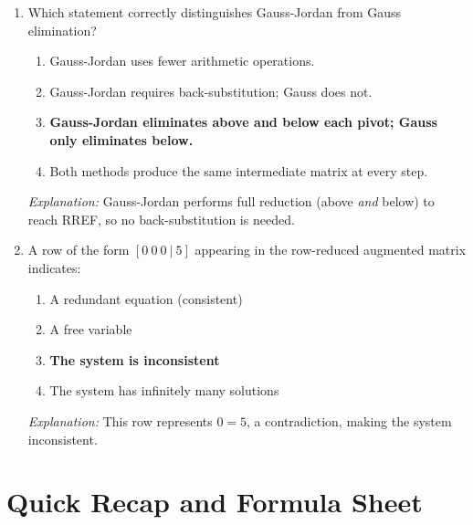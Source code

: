 \documentclass[12pt,a4paper]{article}
\begin{document}
\begin{enumerate}[leftmargin=2em, label=\textbf{MCQ\arabic*.}]
  \item Which statement correctly distinguishes Gauss-Jordan from Gauss elimination?
        \begin{enumerate}[label=(\alph*)]
          \item Gauss-Jordan uses fewer arithmetic operations.
          \item Gauss-Jordan requires back-substitution; Gauss does not.
          \item \textbf{Gauss-Jordan eliminates above and below each pivot; Gauss only eliminates below.}
          \item Both methods produce the same intermediate matrix at every step.
        \end{enumerate}
        \textit{Explanation:} Gauss-Jordan performs full reduction (above \textit{and} below) to reach RREF,
        so no back-substitution is needed.

  \item A row of the form $[0 \ 0 \ 0 \ | \ 5]$ appearing in the row-reduced augmented matrix indicates:
        \begin{enumerate}[label=(\alph*)]
          \item A redundant equation (consistent)
          \item A free variable
          \item \textbf{The system is inconsistent}
          \item The system has infinitely many solutions
        \end{enumerate}
        \textit{Explanation:} This row represents $0 = 5$, a contradiction, making the system inconsistent.
\end{enumerate}

\section{Quick Recap and Formula Sheet}
\end{document}
